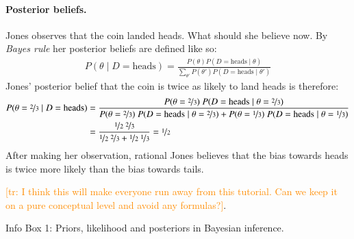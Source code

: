 \documentclass[nobib]{tufte-handout}
\newcommand{\tr}[1]{\textcolor{DarkOrange}{[tr: #1]}}
\begin{document}
\begin{InfoBox}[t]
{\begin{minipage}{1.0\textwidth}
    \paragraph{Posterior beliefs.} Jones observes that the coin landed heads. What should she
    believe now. By \emph{Bayes rule} her posterior beliefs are defined like so:
    \begin{align*}
      P(\theta \mid D = \text{heads}) = \frac{P(\theta) P(D = \text{heads} \mid \theta)}{\sum_{\theta'}P(\theta') P(D = \text{heads} \mid \theta')}
    \end{align*}
    Jones' posterior belief that the coin is twice as likely to land heads is therefore:
    \begin{align*}
      P(\theta = \nicefrac{2}{3} \mid D = \text{heads}) & = \frac{P(\theta = \nicefrac{2}{3}) \ P(D = \text{heads} \mid \theta = \nicefrac{2}{3})}{P(\theta = \nicefrac{2}{3}) \ P(D = \text{heads} \mid \theta = \nicefrac{2}{3}) + P(\theta = \nicefrac{1}{3}) \ P(D = \text{heads} \mid \theta = \nicefrac{1}{3})} \\
            & = \frac{\nicefrac{1}{2} \ \nicefrac{2}{3}}{\nicefrac{1}{2} \ \nicefrac{2}{3} + \nicefrac{1}{2} \ \nicefrac{1}{3}} = \nicefrac{1}{2}
    \end{align*}
    After making her observation, rational Jones believes that the bias towards heads is twice
    more likely than the bias towards tails.
    
    \tr{I think this will make everyone run away from this tutorial. Can we keep it on a pure conceptual level and avoid any formulas?}. 

  \end{minipage} \par
  } \par
  \begin{center}
    Info Box 1: Priors, likelihood and posteriors in Bayesian inference.
  \end{center}
\end{InfoBox}






\printbibliography[heading=bibintoc]
\end{document}
